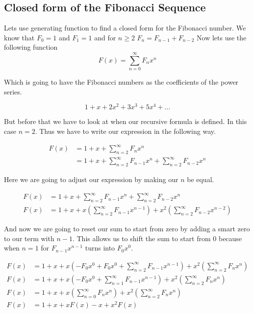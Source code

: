 \subsection{Closed form of the Fibonacci Sequence}

Lets use generating function to find a closed form for the Fibonacci number. 
\newline
We know that \(F_0 = 1\) and \(F_1 = 1\) and for \(n \ge 2\) \(F_n = F_{n-1} + F_{n-2}\)
\newline
Now lets use the following function
\[
    F(x) = \sum_{n = 0}^{\infty} F_n x^{n}
\]

Which is going to have the Fibonacci numbers as the coefficients of the power series.

\[
    1 + x + 2x^2 + 3x^3 + 5x^4 + \dots
\]

But before that we have to look at when our recursive formula is defined.
In this case \(n = 2\). Thus we have to write our expression in the following way.

\begin{align*}
F(x) &= 1 + x + \sum_{n = 2}^{\infty} F_n x^{n}\\
&= 1 + x + \sum_{n = 2}^{\infty} F_{n -1} x^{n} + \sum_{n = 2}^{\infty} F_{n - 2}x^n 
\end{align*}

Here we are going to adjust our expression by making our \(n\) be equal.

\begin{align*}
F(x) &= 1 + x + \sum_{n = 2}^{\infty} F_{n -1} x^{n} + \sum_{n = 2}^{\infty} F_{n - 2}x^n \\ 
F(x) &= 1 + x + x \left( \sum_{n = 2}^{\infty} F_{n -1} x^{n-1}\right) + x^2 \left( \sum_{n = 2}^{\infty} F_{n -2} x^{n-2}\right)
\end{align*}

And now we are going to reset our sum to start from zero by adding a smart zero to our term with \(n - 1\).
This allows us to shift the sum to start from 0 because when \(n = 1\) for \(F_{n - 1}x^{n - 1}\) turns into
\(F_0 x^0\).

\begin{align*}
F(x) &= 1 + x + x \left( -F_{0}x^0 + F_{0}x^0 + \sum_{n = 2}^{\infty} F_{n-1} x^{n-1}\right) + x^2 \left( \sum_{n = 2}^{\infty} F_{n} x^{n}\right)\\
F(x) &= 1 + x + x \left( -F_{0}x^0 + \sum_{n = 1}^{\infty} F_{n-1} x^{n-1}\right) + x^2 \left( \sum_{n = 2}^{\infty} F_{n} x^{n}\right)\\
F(x) &= 1 + x + x \left( \sum_{n = 0}^{\infty} F_{n} x^{n}\right) + x^2 \left( \sum_{n = 2}^{\infty} F_{n} x^{n}\right)\\
F(x) &= 1 + x + x F(x) - x + x^2 F(x)
\end{align*}

